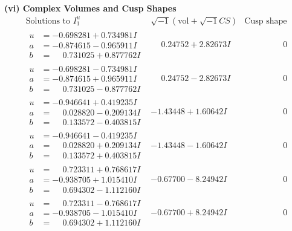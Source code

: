 \documentclass[1p]{elsarticle_modified}
\theoremstyle{definition}
\newcommand{\I}{\sqrt{-1}}
\begin{document}
\newpage\flushleft \textbf{(vi) Complex Volumes and Cusp Shapes}
$$\begin{array}{c|c|c}  
\text{Solutions to }I^u_{1}& \I (\text{vol} + \sqrt{-1}CS) & \text{Cusp shape}\\
 \hline 
\begin{aligned}
u &= -0.698281 + 0.734981 I \\
a &= -0.874615 - 0.965911 I \\
b &= \phantom{-}0.731025 + 0.877762 I\end{aligned}
 & \phantom{-}0.24752 + 2.82673 I & \phantom{-0.000000 } 0 \\ \hline\begin{aligned}
u &= -0.698281 - 0.734981 I \\
a &= -0.874615 + 0.965911 I \\
b &= \phantom{-}0.731025 - 0.877762 I\end{aligned}
 & \phantom{-}0.24752 - 2.82673 I & \phantom{-0.000000 } 0 \\ \hline\begin{aligned}
u &= -0.946641 + 0.419235 I \\
a &= \phantom{-}0.028820 - 0.209134 I \\
b &= \phantom{-}0.133572 - 0.403815 I\end{aligned}
 & -1.43448 + 1.60642 I & \phantom{-0.000000 } 0 \\ \hline\begin{aligned}
u &= -0.946641 - 0.419235 I \\
a &= \phantom{-}0.028820 + 0.209134 I \\
b &= \phantom{-}0.133572 + 0.403815 I\end{aligned}
 & -1.43448 - 1.60642 I & \phantom{-0.000000 } 0 \\ \hline\begin{aligned}
u &= \phantom{-}0.723311 + 0.768617 I \\
a &= -0.938705 + 1.015410 I \\
b &= \phantom{-}0.694302 - 1.112160 I\end{aligned}
 & -0.67700 - 8.24942 I & \phantom{-0.000000 } 0 \\ \hline\begin{aligned}
u &= \phantom{-}0.723311 - 0.768617 I \\
a &= -0.938705 - 1.015410 I \\
b &= \phantom{-}0.694302 + 1.112160 I\end{aligned}
 & -0.67700 + 8.24942 I & \phantom{-0.000000 } 0 \\ \hline\begin{aligned}

\end{aligned}
\end{array}$$
\end{document}
